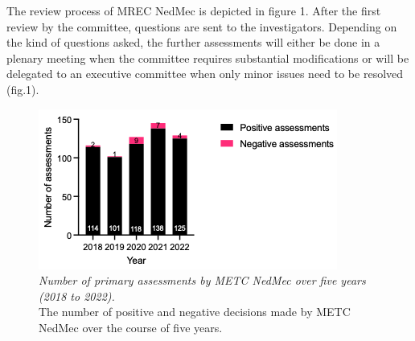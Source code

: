 \documentclass[authordate, meta, issue]{jote-new-article}
\begin{document}
The review process of MREC NedMec is depicted in figure 1. After the first review by the committee, questions are sent to the investigators. Depending on the kind of questions asked, the further assessments will either be done in a plenary meeting when the committee requires substantial modifications or will be delegated to an executive committee when only minor issues need to be resolved (fig.1).

























































\begin{figure}[t!]
  \begin{fullwidth}
    \includegraphics[width=\linewidth]{media/Picture2.png}

    \caption{\emph{Number of primary assessments by METC NedMec over five years (2018 to 2022).}\\
      The number of positive and negative decisions made by METC NedMec over the course of five years.}

    \label{fig:rId12}

  \end{fullwidth}
\end{figure}
\end{document}
